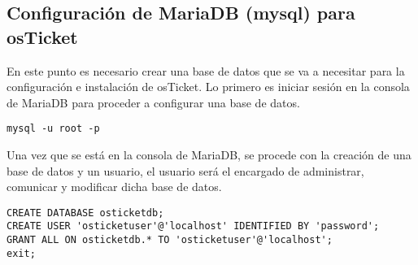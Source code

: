 \subsection{Configuración de MariaDB (mysql) para osTicket}
En este punto es necesario crear una base de datos que se va a necesitar para la configuración e instalación de osTicket. Lo primero es iniciar sesión en la consola de MariaDB para proceder a configurar una base de datos.
\begin{lstlisting} 
mysql -u root -p
\end{lstlisting}
Una vez que se está en la consola de MariaDB, se procede con la creación de una base de datos y un usuario, el usuario será el encargado de administrar, comunicar y modificar dicha base de datos.
\begin{lstlisting} 
CREATE DATABASE osticketdb;
CREATE USER 'osticketuser'@'localhost' IDENTIFIED BY 'password';
GRANT ALL ON osticketdb.* TO 'osticketuser'@'localhost';
exit; 
\end{lstlisting}
